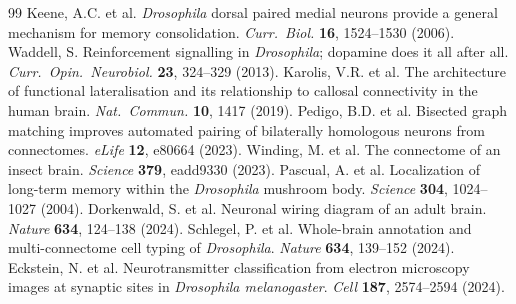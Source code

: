 \documentclass[10pt]{article}
\begin{document}
\begin{thebibliography}{99}
 Keene, A.C. et al. \textit{Drosophila} dorsal paired medial neurons provide a general mechanism for memory consolidation. \textit{Curr.\ Biol.} \textbf{16}, 1524--1530 (2006).
 Waddell, S. Reinforcement signalling in \textit{Drosophila}; dopamine does it all after all. \textit{Curr.\ Opin.\ Neurobiol.} \textbf{23}, 324--329 (2013).
 Karolis, V.R. et al. The architecture of functional lateralisation and its relationship to callosal connectivity in the human brain. \textit{Nat.\ Commun.} \textbf{10}, 1417 (2019).
 Pedigo, B.D. et al. Bisected graph matching improves automated pairing of bilaterally homologous neurons from connectomes. \textit{eLife} \textbf{12}, e80664 (2023).
 Winding, M. et al. The connectome of an insect brain. \textit{Science} \textbf{379}, eadd9330 (2023).
 Pascual, A. et al. Localization of long-term memory within the \textit{Drosophila} mushroom body. \textit{Science} \textbf{304}, 1024--1027 (2004).
 Dorkenwald, S. et al. Neuronal wiring diagram of an adult brain. \textit{Nature} \textbf{634}, 124--138 (2024).
 Schlegel, P. et al. Whole-brain annotation and multi-connectome cell typing of \textit{Drosophila}. \textit{Nature} \textbf{634}, 139--152 (2024).
 Eckstein, N. et al. Neurotransmitter classification from electron microscopy images at synaptic sites in \textit{Drosophila melanogaster}. \textit{Cell} \textbf{187}, 2574--2594 (2024).
\end{thebibliography}
\end{document}
